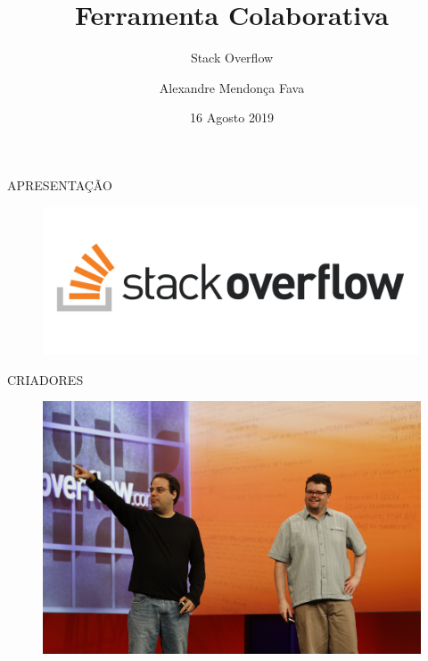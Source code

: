\documentclass{Alexandre}
\title{Ferramenta Colaborativa}
\subtitle{Stack Overflow}
\author{Alexandre Mendonça Fava\inst{1}}
\institute[UDESC]{
  \newline \newline \newline
  \inst{1}
  Mestrado Acadêmico em Computação Aplicada - PPGCA
}
\date{16 Agosto 2019}
\begin{document}
\begin{frame}
  \titlepage
\end{frame}


\begin{frame}{APRESENTAÇÃO}

    \begin{figure}
        \includegraphics[scale = 0.2]{Figuras/Logo-StackOverflow.png}
    \end{figure}

\end{frame}


\begin{frame}{CRIADORES}

    \begin{figure}
        \includegraphics[scale = 0.06]{Figuras/Criadores-StackOverflow.jpg}
    \end{figure}

\end{frame}
\end{document}

